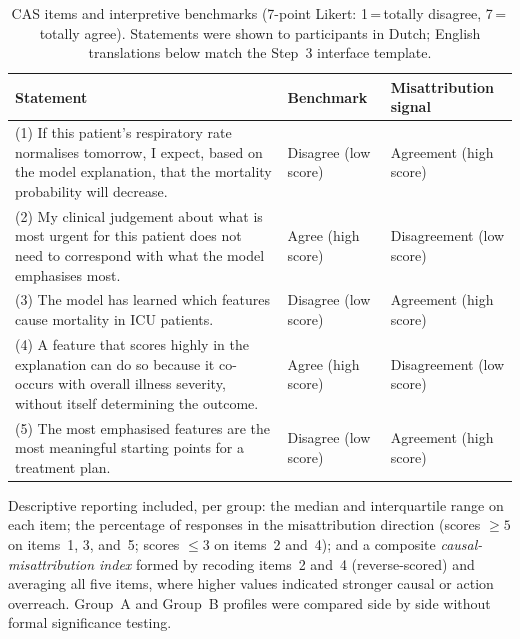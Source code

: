 \documentclass[12pt, a4paper]{article}
\begin{document}
\begin{table}[htbp]
  \centering
  \scriptsize
  \renewcommand{\arraystretch}{1.3}
  \setlength{\tabcolsep}{4pt}
  \caption{CAS items and interpretive benchmarks (7-point Likert:
    1\,=\,totally disagree, 7\,=\,totally agree). Statements were shown
    to participants in Dutch; English translations below match
    the Step~3 interface template.}
  \label{tab:cas_benchmarks}
  \begin{tabular}{@{}>{\raggedright\arraybackslash}p{}>{\raggedright\arraybackslash}p{}>{\raggedright\arraybackslash}p{}@{}}
    \toprule
    \textbf{Statement} & \textbf{Benchmark} & \textbf{Misattribution signal} \\
    \midrule
    (1) If this patient's respiratory rate normalises tomorrow, I
    expect, based on the model explanation, that the mortality
    probability will decrease. &
    Disagree (low score) &
    Agreement (high score) \\[6pt]
    (2) My clinical judgement about what is most urgent for this
    patient does not need to correspond with what the model emphasises
    most. &
    Agree (high score) &
    Disagreement (low score) \\[6pt]
    (3) The model has learned which features cause mortality in ICU
    patients. &
    Disagree (low score) &
    Agreement (high score) \\[6pt]
    (4) A feature that scores highly in the explanation can do so
    because it co-occurs with overall illness severity, without itself
    determining the outcome. &
    Agree (high score) &
    Disagreement (low score) \\[6pt]
    (5) The most emphasised features are the most meaningful starting
    points for a treatment plan. &
    Disagree (low score) &
    Agreement (high score) \\
    \bottomrule
  \end{tabular}
\end{table}

\noindent
Descriptive reporting included, per group: the median and interquartile
range on each item; the percentage of responses in the misattribution
direction (scores $\geq 5$ on items~1, 3, and~5; scores $\leq 3$ on
items~2 and~4); and a composite \emph{causal-misattribution index}
formed by recoding items~2 and~4 (reverse-scored) and averaging all
five items, where higher values indicated stronger causal or action
overreach. Group~A and Group~B profiles were compared side by side
without formal significance testing.
\end{document}
